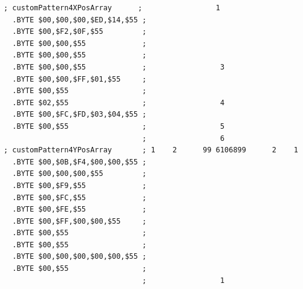 \begin{lstlisting}[basicstyle=\tiny]
 ; customPattern4XPosArray      ;                 1                     
  .BYTE $00,$00,$00,$ED,$14,$55 ;                                       
  .BYTE $00,$F2,$0F,$55         ;                                       
  .BYTE $00,$00,$55             ;                                       
  .BYTE $00,$00,$55             ;                                       
  .BYTE $00,$00,$55             ;                 3                     
  .BYTE $00,$00,$FF,$01,$55     ;                                       
  .BYTE $00,$55                 ;                                       
  .BYTE $02,$55                 ;                 4                     
  .BYTE $00,$FC,$FD,$03,$04,$55 ;                                       
  .BYTE $00,$55                 ;                 5                     
                                ;                 6                     
; customPattern4YPosArray       ; 1    2      99 6106899      2    1    
  .BYTE $00,$0B,$F4,$00,$00,$55 ;                                       
  .BYTE $00,$00,$00,$55         ;                                       
  .BYTE $00,$F9,$55             ;                                       
  .BYTE $00,$FC,$55             ;                                       
  .BYTE $00,$FE,$55             ;                                       
  .BYTE $00,$FF,$00,$00,$55     ;                                       
  .BYTE $00,$55                 ;                                       
  .BYTE $00,$55                 ;                                       
  .BYTE $00,$00,$00,$00,$00,$55 ;                                       
  .BYTE $00,$55                 ;                                       
                                ;                 1                     
\end{lstlisting}


